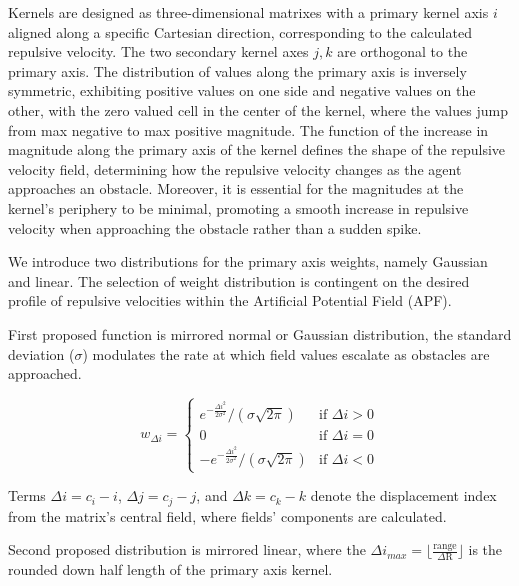 \documentclass[letterpaper, 10 pt, conference]{ieeeconf}  %
\begin{document}

Kernels are designed as three-dimensional matrixes with a primary kernel axis $i$ aligned along a specific Cartesian direction, corresponding to the calculated repulsive velocity. The two secondary kernel axes $j,k$ are orthogonal to the primary axis. The distribution of values along the primary axis is inversely symmetric, exhibiting positive values on one side and negative values on the other, with the zero valued cell in the center of the kernel, where the values jump from max negative to max positive magnitude. The function of the increase in magnitude along the primary axis of the kernel defines the shape of the repulsive velocity field, determining how the repulsive velocity changes as the agent approaches an obstacle. Moreover, it is essential for the magnitudes at the kernel's periphery to be minimal, promoting a smooth increase in repulsive velocity when approaching the obstacle rather than a sudden spike.

We introduce two distributions for the primary axis weights, namely Gaussian and linear. The selection of weight distribution is contingent on the desired profile of repulsive velocities within the Artificial Potential Field (APF).

First proposed function is mirrored normal or Gaussian distribution, the standard deviation (\(\sigma\)) modulates the rate at which field values escalate as obstacles are approached.

\begin{equation}
w_{\Delta i} = 
\begin{cases} 
	e^{-\frac{\Delta i^2}{2\sigma^2}} / (\sigma \sqrt{2\pi}) & \text{if } \Delta i > 0 \\
	0 & \text{if } \Delta i = 0 \\
	-e^{-\frac{\Delta i^2}{2\sigma^2}} / (\sigma \sqrt{2\pi}) & \text{if } \Delta i < 0 
\end{cases}
\end{equation}

Terms \(\Delta i = c_i - i\), \(\Delta j = c_j - j\), and \(\Delta k = c_k - k\) denote the displacement index from the matrix's central field, where fields' components are calculated.

Second proposed distribution is mirrored linear, where the $\Delta i_{max} = \lfloor \frac{\mathrm{range}}{\Delta \mathrm{R}} \rfloor$ is the rounded down half length of the primary axis kernel. 
\end{document}
